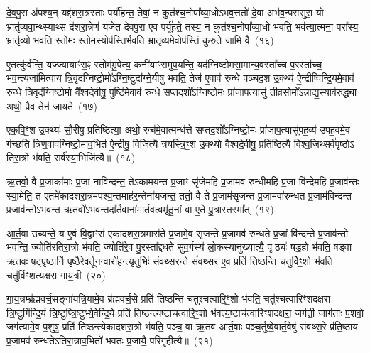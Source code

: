 दे॒व॒पु॒रा अ॑पश्य॒न् यद्द॑शरा॒त्रस्ताः पर्यौ॑हन्त॒ तेषां॒ न कुत॑श्च॒नोपा᳚व्या॒धो॑\-ऽभव॒त्ततो॑ दे॒वा अभ॑व॒न्परासु॑रा॒ यो भ्रातृ॑व्यवा॒न्थ्स्याथ्स द॑शरा॒त्रेण॑ यजेत देवपु॒रा ए॒व पर्यू॑हते॒ तस्य॒ न कुत॑श्च॒नोपा᳚व्या॒धो भ॑वति॒ भव॑त्या॒त्मना॒ परा᳚स्य॒ भ्रातृ॑व्यो भवति॒ स्तोमः॒ स्तोम॒स्योप॑स्तिर्भवति॒ भ्रातृ॑व्यमे॒वोप॑स्तिं कुरुते जा॒मि वै~(१६)

ए॒तत्कु॑र्वन्ति॒ यज्ज्यायाꣳ॑स॒ꣴ॒ स्तोम॑मु॒पेत्य॒ कनी॑याꣳसमुप॒यन्ति॒ यद॑ग्निष्टोमसा॒मान्य॒वस्ता᳚च्च प॒रस्ता᳚च्च॒ भव॒न्त्यजा॑मित्वाय त्रि॒वृद॑ग्निष्टो॒मो᳚\-ऽग्नि॒ष्टुदा᳚ग्ने॒यीषु॑ भवति॒ तेज॑ ए॒वाव॑ रुन्धे पञ्चद॒श उ॒क्थ्य॑ ऐ॒न्द्रीष्वि॑न्द्रि॒यमे॒वाव॑ रुन्धे त्रि॒वृद॑ग्निष्टो॒मो वै᳚श्वदे॒वीषु॒ पुष्टि॑मे॒वाव॑ रुन्धे सप्तद॒शो᳚\-ऽग्निष्टो॒मः प्रा॑जाप॒त्यासु॑ तीव्रसो॒मो᳚\-ऽन्नाद्य॒स्याव॑रुद्ध्या॒ अथो॒ प्रैव तेन॑ जायते~(१७)

ए॒क॒वि॒ꣳ॒श उ॒क्थ्यः॑ सौ॒रीषु॒ प्रति॑ष्ठित्या॒ अथो॒ रुच॑मे॒वात्मन्ध॑त्ते सप्तद॒शो᳚\-ऽग्निष्टो॒मः प्रा॑जाप॒त्यासू॑पह॒व्य॑ उपह॒वमे॒व ग॑च्छति त्रिण॒वाव॑ग्निष्टो॒माव॒भित॑ ऐ॒न्द्रीषु॒ विजि॑त्यै त्रयस्त्रि॒ꣳ॒श उ॒क्थ्यो॑ वैश्वदे॒वीषु॒ प्रति॑ष्ठित्यै विश्व॒जिथ्सर्व॑पृष्ठो\-ऽ तिरा॒त्रो भ॑वति॒ सर्व॑स्या॒भिजि॑त्यै॥~(१८)

{\anuvakamend[{प्रा॒जा॒प॒त्यो वा ए॒ष य॒ज्ञो यद्द॑शरा॒त्रस्त्रि॑क॒कुद्वा ए॒ता वै जा॑यत॒ एक॑त्रिꣳशच्च}]}%

ऋ॒तवो॒ वै प्र॒जाका॑माः प्र॒जां नावि॑न्दन्त॒ ते॑\-ऽकामयन्त प्र॒जाꣳ सृ॑जेमहि प्र॒जामव॑ रुन्धीमहि प्र॒जां वि॑न्देमहि प्र॒जाव॑न्तः स्या॒मेति॒ त ए॒तमे॑कादशरा॒त्रम॑पश्य॒न्तमाह॑र॒न्तेना॑यजन्त॒ ततो॒ वै ते प्र॒जाम॑सृजन्त प्र॒जामवा॑रुन्धत प्र॒जाम॑विन्दन्त प्र॒जाव॑न्तो\-ऽभव॒न्त ऋ॒तवो॑\-ऽभव॒न्तदा᳚र्त॒वाना॑मार्तव॒त्वमृ॑तू॒नां वा ए॒ते पु॒त्रास्तस्मा᳚त्~(१९)

आ॒र्त॒वा उ॑च्यन्ते॒ य ए॒वं वि॒द्वाꣳस॑ एकादशरा॒त्रमास॑ते प्र॒जामे॒व सृ॑जन्ते प्र॒जामव॑ रुन्धते प्र॒जां वि॑न्दन्ते प्र॒जाव॑न्तो भवन्ति॒ ज्योति॑रतिरा॒त्रो भ॑वति॒ ज्योति॑रे॒व पु॒रस्ता᳚द्दधते सुव॒र्गस्य॑ लो॒कस्यानु॑ख्यात्यै॒ पृठ्यः॑ षड॒हो भ॑वति॒ षड्वा ऋ॒तवः॒ षट्पृ॒ष्ठानि॑ पृ॒ष्ठैरे॒वर्तून॒न्वारो॑हन्त्यृ॒तुभिः॑ संवथ्स॒रन्ते सं॑वथ्स॒र ए॒व प्रति॑ तिष्ठन्ति चतुर्वि॒ꣳ॒शो भ॑वति॒ चतु॑र्विꣳशत्यक्षरा गाय॒त्री~(२०)

गा॒य॒त्रम्ब्र॑ह्मवर्च॒सङ्गा॑यत्रि॒यामे॒व ब्र॑ह्मवर्च॒से प्रति॑ तिष्ठन्ति चतुश्चत्वारि॒ꣳ॒शो भ॑वति॒ चतु॑श्चत्वारिꣳशदक्षरा त्रि॒ष्टुगि॑न्द्रि॒यं त्रि॒ष्टुप्त्रि॒ष्टुभ्ये॒वेन्द्रि॒ये प्रति॑ तिष्ठन्त्यष्टाचत्वारि॒ꣳ॒शो भ॑वत्य॒ष्टाच॑त्वारिꣳशदक्षरा॒ जग॑ती॒ जाग॑ताः प॒शवो॒ जग॑त्यामे॒व प॒शुषु॒ प्रति॑ तिष्ठन्त्येकादशरा॒त्रो भ॑वति॒ पञ्च॒ वा ऋ॒तव॑ आर्त॒वाः पञ्च॒र्तुष्वे॒वार्त॒वेषु॑ संवथ्स॒रे प्र॑ति॒ष्ठाय॑ प्र॒जामव॑ रुन्धते\-ऽतिरा॒त्राव॒भितो॑ भवतः प्र॒जायै॒ परि॑गृहीत्यै॥~(२१)


